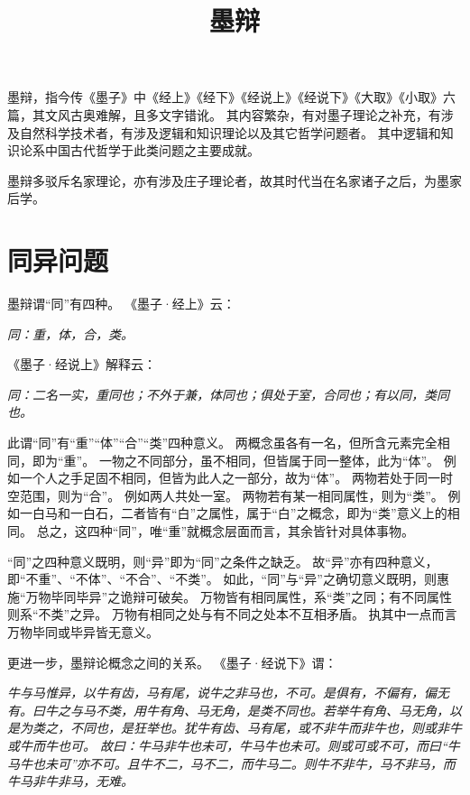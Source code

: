 \documentclass[11pt]{article}
\title{墨辩}
\date{}
\begin{document}
  \maketitle
  
  \linenumbers

墨辩，指今传《墨子》中《经上》《经下》《经说上》《经说下》《大取》《小取》六篇，其文风古奥难解，且多文字错讹。
其内容繁杂，有对墨子理论之补充，有涉及自然科学技术者，有涉及逻辑和知识理论以及其它哲学问题者。
其中逻辑和知识论系中国古代哲学于此类问题之主要成就。

\par

墨辩多驳斥名家理论，亦有涉及庄子理论者，故其时代当在名家诸子之后，为墨家后学。

\section{同异问题}
墨辩谓“同”有四种。
《墨子·经上》云：

\textit{同：重，体，合，类。}

《墨子·经说上》解释云：

\textit{同：二名一实，重同也；不外于兼，体同也；俱处于室，合同也；有以同，类同也。}

此谓“同”有“重”“体”“合”“类”四种意义。
两概念虽各有一名，但所含元素完全相同，即为“重”。
一物之不同部分，虽不相同，但皆属于同一整体，此为“体”。
例如一个人之手足固不相同，但皆为此人之一部分，故为“体”。
两物若处于同一时空范围，则为“合”。
例如两人共处一室。
两物若有某一相同属性，则为“类”。
例如一白马和一白石，二者皆有“白”之属性，属于“白”之概念，即为“类”意义上的相同。
总之，这四种“同”，唯“重”就概念层面而言，其余皆针对具体事物。

\par

“同”之四种意义既明，则“异”即为“同”之条件之缺乏。
故“异”亦有四种意义，即“不重”、“不体”、“不合”、“不类”。
如此，“同”与“异”之确切意义既明，则惠施“万物毕同毕异”之诡辩可破矣。
万物皆有相同属性，系“类”之同；有不同属性则系“不类”之异。
万物有相同之处与有不同之处本不互相矛盾。
执其中一点而言万物毕同或毕异皆无意义。

\par

更进一步，墨辩论概念之间的关系。
《墨子·经说下》谓：

\textit{牛与马惟异，以牛有齿，马有尾，说牛之非马也，不可。是俱有，不偏有，偏无有。曰牛之与马不类，用牛有角、马无角，是类不同也。若举牛有角、马无角，以是为类之，不同也，是狂举也。犹牛有齿、马有尾，或不非牛而非牛也，则或非牛或牛而牛也可。
故曰：牛马非牛也未可，牛马牛也未可。则或可或不可，而曰“牛马牛也未可”亦不可。且牛不二，马不二，而牛马二。则牛不非牛，马不非马，而牛马非牛非马，无难。}
\end{document}
